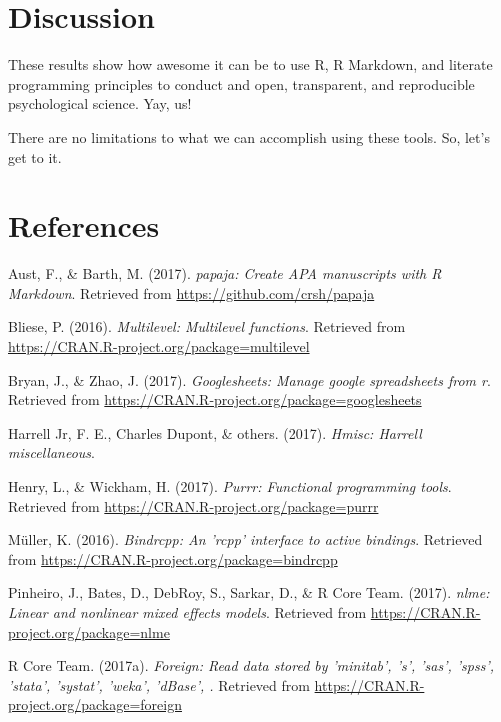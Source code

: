 \documentclass[english,man]{apa6}
\theoremstyle{definition}
\theoremstyle{definition}
\theoremstyle{remark}
\begin{document}
\section{Discussion}\label{discussion}

These results show how awesome it can be to use R, R Markdown, and
literate programming principles to conduct and open, transparent, and
reproducible psychological science. Yay, us!

There are no limitations to what we can accomplish using these tools.
So, let's get to it.

\newpage

\section{References}\label{references}

\setlength{\parindent}{-0.5in} \setlength{\leftskip}{0.5in}

\hypertarget{refs}{}
\hypertarget{ref-R-papaja}{}
Aust, F., \& Barth, M. (2017). \emph{papaja: Create APA manuscripts with
R Markdown}. Retrieved from \url{https://github.com/crsh/papaja}

\hypertarget{ref-R-multilevel}{}
Bliese, P. (2016). \emph{Multilevel: Multilevel functions}. Retrieved
from \url{https://CRAN.R-project.org/package=multilevel}

\hypertarget{ref-R-googlesheets}{}
Bryan, J., \& Zhao, J. (2017). \emph{Googlesheets: Manage google
spreadsheets from r}. Retrieved from
\url{https://CRAN.R-project.org/package=googlesheets}

\hypertarget{ref-R-Hmisc}{}
Harrell Jr, F. E., Charles Dupont, \& others. (2017). \emph{Hmisc:
Harrell miscellaneous}.

\hypertarget{ref-R-purrr}{}
Henry, L., \& Wickham, H. (2017). \emph{Purrr: Functional programming
tools}. Retrieved from \url{https://CRAN.R-project.org/package=purrr}

\hypertarget{ref-R-bindrcpp}{}
Müller, K. (2016). \emph{Bindrcpp: An 'rcpp' interface to active
bindings}. Retrieved from
\url{https://CRAN.R-project.org/package=bindrcpp}

\hypertarget{ref-R-nlme}{}
Pinheiro, J., Bates, D., DebRoy, S., Sarkar, D., \& R Core Team. (2017).
\emph{nlme: Linear and nonlinear mixed effects models}. Retrieved from
\url{https://CRAN.R-project.org/package=nlme}

\hypertarget{ref-R-foreign}{}
R Core Team. (2017a). \emph{Foreign: Read data stored by 'minitab', 's',
'sas', 'spss', 'stata', 'systat', 'weka', 'dBase', .} Retrieved from
\url{https://CRAN.R-project.org/package=foreign}
\end{document}
